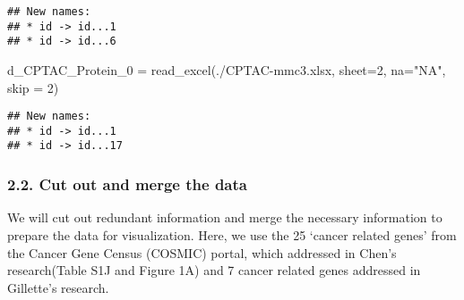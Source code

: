 \documentclass[
]{article}
\newenvironment{Shaded}{\begin{snugshade}}{\end{snugshade}}
\newcommand{\AttributeTok}[1]{\textcolor[rgb]{0.77,0.63,0.00}{#1}}
\newcommand{\DecValTok}[1]{\textcolor[rgb]{0.00,0.00,0.81}{#1}}
\newcommand{\FunctionTok}[1]{\textcolor[rgb]{0.00,0.00,0.00}{#1}}
\newcommand{\NormalTok}[1]{#1}
\newcommand{\OtherTok}[1]{\textcolor[rgb]{0.56,0.35,0.01}{#1}}
\newcommand{\StringTok}[1]{\textcolor[rgb]{0.31,0.60,0.02}{#1}}
\begin{document}
\begin{verbatim}
## New names:
## * id -> id...1
## * id -> id...6
\end{verbatim}

\begin{Shaded}
\begin{Highlighting}[]
\NormalTok{d\_CPTAC\_Protein\_0 }\OtherTok{=} \FunctionTok{read\_excel}\NormalTok{(}\StringTok{\textquotesingle{}./CPTAC{-}mmc3.xlsx\textquotesingle{}}\NormalTok{, }\AttributeTok{sheet=}\DecValTok{2}\NormalTok{, }\AttributeTok{na=}\StringTok{"NA"}\NormalTok{, }\AttributeTok{skip =} \DecValTok{2}\NormalTok{)}
\end{Highlighting}
\end{Shaded}

\begin{verbatim}
## New names:
## * id -> id...1
## * id -> id...17
\end{verbatim}

\hypertarget{cut-out-and-merge-the-data}{%
\subsubsection{2.2. Cut out and merge the
data}\label{cut-out-and-merge-the-data}}

We will cut out redundant information and merge the necessary
information to prepare the data for visualization. Here, we use the 25
`cancer related genes' from the Cancer Gene Census (COSMIC) portal,
which addressed in Chen's research(Table S1J and Figure 1A) and 7 cancer
related genes addressed in Gillette's research.
\end{document}

